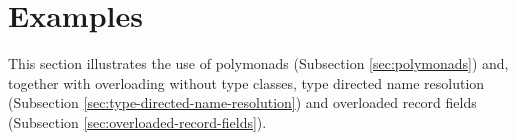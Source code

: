 \section{Examples}
\label{sec:examples}

This section illustrates the use of polymonads (Subsection
\ref{sec:polymonads}) and, together with overloading without type
classes, type directed name resolution (Subsection
\ref{sec:type-directed-name-resolution}) and overloaded record fields
(Subsection \ref{sec:overloaded-record-fields}).






